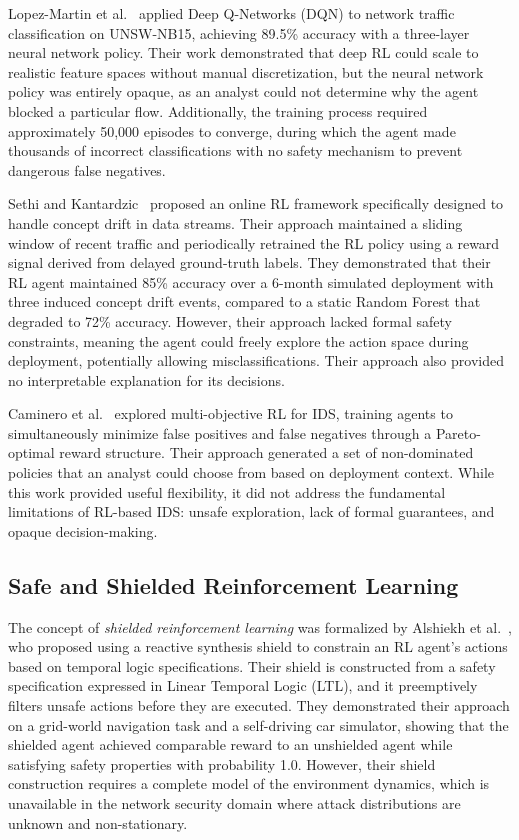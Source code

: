 \documentclass[12pt, letterpaper, oneside]{report}
\begin{document}
Lopez-Martin et al.~\citep{lopez2020} applied Deep Q-Networks (DQN) to network traffic classification on UNSW-NB15, achieving 89.5\% accuracy with a three-layer neural network policy. Their work demonstrated that deep RL could scale to realistic feature spaces without manual discretization, but the neural network policy was entirely opaque, as an analyst could not determine why the agent blocked a particular flow. Additionally, the training process required approximately 50,000 episodes to converge, during which the agent made thousands of incorrect classifications with no safety mechanism to prevent dangerous false negatives.

Sethi and Kantardzic~\citep{sethi2018} proposed an online RL framework specifically designed to handle concept drift in data streams. Their approach maintained a sliding window of recent traffic and periodically retrained the RL policy using a reward signal derived from delayed ground-truth labels. They demonstrated that their RL agent maintained 85\% accuracy over a 6-month simulated deployment with three induced concept drift events, compared to a static Random Forest that degraded to 72\% accuracy. However, their approach lacked formal safety constraints, meaning the agent could freely explore the action space during deployment, potentially allowing misclassifications. Their approach also provided no interpretable explanation for its decisions.

Caminero et al.~\citep{caminero2019} explored multi-objective RL for IDS, training agents to simultaneously minimize false positives and false negatives through a Pareto-optimal reward structure. Their approach generated a set of non-dominated policies that an analyst could choose from based on deployment context. While this work provided useful flexibility, it did not address the fundamental limitations of RL-based IDS: unsafe exploration, lack of formal guarantees, and opaque decision-making.

\subsection{Safe and Shielded Reinforcement Learning}

The concept of \emph{shielded reinforcement learning} was formalized by Alshiekh et al.~\citep{alshiekh2018}, who proposed using a reactive synthesis shield to constrain an RL agent's actions based on temporal logic specifications. Their shield is constructed from a safety specification expressed in Linear Temporal Logic (LTL), and it preemptively filters unsafe actions before they are executed. They demonstrated their approach on a grid-world navigation task and a self-driving car simulator, showing that the shielded agent achieved comparable reward to an unshielded agent while satisfying safety properties with probability 1.0. However, their shield construction requires a complete model of the environment dynamics, which is unavailable in the network security domain where attack distributions are unknown and non-stationary.
\end{document}
